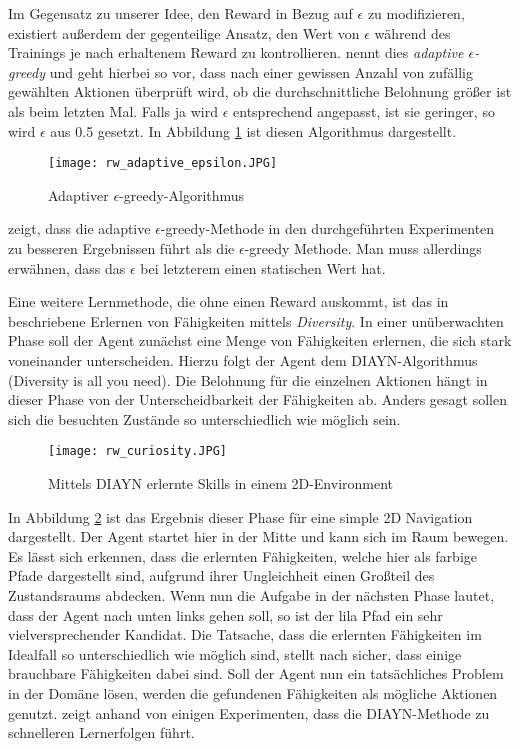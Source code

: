 Im Gegensatz zu unserer Idee, den Reward in Bezug auf $ \epsilon $ zu modifizieren, existiert außerdem der gegenteilige Ansatz, den Wert von $ \epsilon $ während des Trainings je nach erhaltenem Reward zu kontrollieren. \cite{r13_dos2017adaptive} nennt dies \textit{adaptive $ \epsilon $-greedy} und geht hierbei so vor, dass nach einer gewissen Anzahl von zufällig gewählten Aktionen überprüft wird, ob die durchschnittliche Belohnung größer ist als beim letzten Mal. Falls ja wird $ \epsilon $ entsprechend angepasst, ist sie geringer, so wird $ \epsilon $ aus 0.5 gesetzt. In Abbildung \ref{img:rwAdaptiveEpsilon} ist diesen Algorithmus dargestellt. 
\begin{figure}[h!]
    \centering
    \texttt{[image: rw\_adaptive\_epsilon.JPG]}
    \caption{Adaptiver $ \epsilon $-greedy-Algorithmus} \label{img:rwAdaptiveEpsilon}
\end{figure}
\cite{r13_dos2017adaptive} zeigt, dass die adaptive $ \epsilon $-greedy-Methode in den durchgeführten Experimenten zu besseren Ergebnissen führt als die $ \epsilon $-greedy Methode. Man muss allerdings erwähnen, dass das $ \epsilon $ bei letzterem einen statischen Wert hat.

Eine weitere Lernmethode, die ohne einen Reward auskommt, ist das in \cite{r02_eysenbach2018diversity} beschriebene Erlernen von Fähigkeiten mittels \textit{Diversity}. In einer unüberwachten Phase soll der Agent zunächst eine Menge von Fähigkeiten erlernen, die sich stark voneinander unterscheiden. Hierzu folgt der Agent dem DIAYN-Algorithmus (\glqq Diversity is all you need\grqq{}). Die Belohnung für die einzelnen Aktionen hängt in dieser Phase von der Unterscheidbarkeit der Fähigkeiten ab. Anders gesagt sollen sich die besuchten Zustände so unterschiedlich wie möglich sein.
\begin{figure}[h!]
    \centering
    \texttt{[image: rw\_curiosity.JPG]}
    \caption{Mittels DIAYN erlernte Skills in einem 2D-Environment} \label{img:rwCuriosity}
\end{figure}
In Abbildung \ref{img:rwCuriosity} ist das Ergebnis dieser Phase für eine simple 2D Navigation dargestellt. Der Agent startet hier in der Mitte und kann sich im Raum bewegen. Es lässt sich erkennen, dass die erlernten Fähigkeiten, welche hier als farbige Pfade dargestellt sind, aufgrund ihrer Ungleichheit einen Großteil des Zustandsraums abdecken. Wenn nun die Aufgabe in der nächsten Phase lautet, dass der Agent nach unten links gehen soll, so ist der lila Pfad ein sehr vielversprechender Kandidat. Die Tatsache, dass die erlernten Fähigkeiten im Idealfall so unterschiedlich wie möglich sind, stellt nach \cite{r02_eysenbach2018diversity} sicher, dass einige brauchbare Fähigkeiten dabei sind. Soll der Agent nun ein tatsächliches Problem in der Domäne lösen, werden die gefundenen Fähigkeiten als mögliche Aktionen genutzt. \cite{r02_eysenbach2018diversity} zeigt anhand von einigen Experimenten, dass die DIAYN-Methode zu schnelleren Lernerfolgen führt. 


